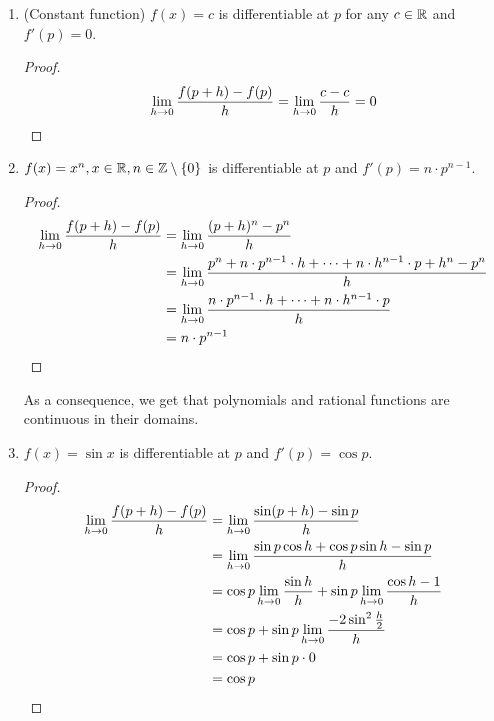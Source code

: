 \documentclass[12pt]{article}
\begin{document}
\begin{example}
    \begin{enumerate}[label=(\alph*)]
        \item (Constant function) $f(x) = c$ is differentiable at $p$ for any $c \in \mathbb{R}$ and $f'(p) = 0$.
        \begin{proof}
        \[
            \lim_{h \to 0} \frac{f(p + h) - f(p)}{h} = \lim_{h \to 0} \frac{c - c}{h} = 0 \qedhere
        \]
        \end{proof}
        \item $f(x) = x^{n}, x \in \R, n \in \Z \setminus \set{0}$ is differentiable at $p$ and $f'(p) = n \cdot p^{n - 1}$.
        \begin{proof}
            \begin{align*}
                \lim_{h \to 0} \frac{f(p + h) - f(p)}{h} &= \lim_{h \to 0} \frac{(p + h)^{n} - p^{n}}{h} \\
                &= \lim_{h \to 0} \frac{p^{n} + n \cdot p^{n - 1} \cdot h + \cdots + n \cdot h^{n - 1} \cdot p + h^{n} - p^{n}}{h} \\
                &= \lim_{h \to 0} \frac{n \cdot p^{n - 1} \cdot h + \cdots + n \cdot h^{n - 1} \cdot p}{h} \\
                &= n \cdot p^{n - 1} \qedhere
            \end{align*}
        \end{proof}
        As a consequence, we get that polynomials and rational functions are continuous in their domains.

        \item $f(x) = \sin x$ is differentiable at $p$ and $f'(p) = \cos p$.
        \begin{proof}
            \begin{align*}
                \lim_{h \to 0} \frac{f(p + h) - f(p)}{h} &= \lim_{h \to 0} \frac{\sin(p + h) - \sin p}{h} \\
                &= \lim_{h \to 0} \frac{\sin p \cos h + \cos p \sin h - \sin p}{h} \\
                &= \cos p \lim_{h \to 0} \frac{\sin h}{h} + \sin p \lim_{h \to 0} \frac{\cos h - 1}{h} \\
                &= \cos p + \sin p \lim_{h \to 0} \frac{-2 \sin^{2} \frac{h}{2}}{h} \\
                &= \cos p + \sin p \cdot 0 \\
                &= \cos p \qedhere
            \end{align*}
        \end{proof}


\end{enumerate}
\end{example}
\end{document}
